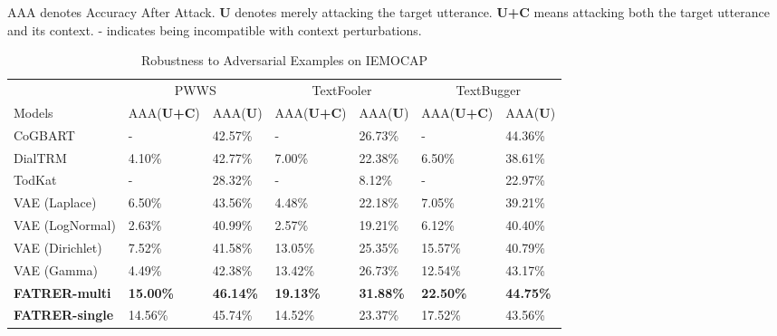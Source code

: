 \documentclass{ecai}
\begin{document}
\begin{table*}[t]
    {\scriptsize AAA denotes Accuracy After Attack. \textbf{U} denotes merely attacking the target utterance. \textbf{U+C} means attacking both the target utterance and its context. - indicates being incompatible with context perturbations.}
    \begin{center}
    \begin{tabular}{p{3cm}|p{1.8cm}p{1.8cm}|p{1.8cm}p{1.8cm}|p{1.8cm}p{1.8cm}}
    \toprule
         & \multicolumn{2}{c|}{PWWS} & \multicolumn{2}{c|}{TextFooler} & \multicolumn{2}{c}{TextBugger} \\
        Models & {\footnotesize AAA(\textbf{U+C}) } & {\footnotesize AAA(\textbf{U}) } 
               & {\footnotesize AAA(\textbf{U+C}) } & {\footnotesize AAA(\textbf{U}) }
               & {\footnotesize AAA(\textbf{U+C}) } & {\footnotesize AAA(\textbf{U}) }\\ 
        \hline\hline
        CoGBART         & -      & 42.57\% &  -      & 26.73\% &       - & 44.36\%\\
        DialTRM         & 4.10\% & 42.77\% &  7.00\% & 22.38\% &  6.50\% & 38.61\%\\
        TodKat          & -      & 28.32\% &  -      &  8.12\% &       - & 22.97\%\\
        VAE (Laplace)   & 6.50\% & 43.56\% &  4.48\% & 22.18\% &  7.05\% & 39.21\%\\ 
        VAE (LogNormal) & 2.63\% & 40.99\% &  2.57\% & 19.21\% &  6.12\% & 40.40\%\\
        VAE (Dirichlet) & 7.52\% & 41.58\% & 13.05\% & 25.35\% & 15.57\% & 40.79\%\\
        VAE (Gamma)     & 4.49\% & 42.38\% & 13.42\% & 26.73\% & 12.54\% & 43.17\%\\
        \hline\hline
        \textbf{FATRER-multi} & \textbf{15.00\%} & \textbf{46.14\%} & \textbf{19.13\%} & \textbf{31.88\%} & \textbf{22.50\%} & \textbf{44.75\%} \\
        \textbf{FATRER-single} & 14.56\% & 45.74\% & 14.52\% & 23.37\% & 17.52\% & 43.56\% \\
    \bottomrule
    \end{tabular}
    \end{center}
    \caption{Robustness to Adversarial Examples on IEMOCAP}
    \label{tab:robustness_iemocap}
\end{table*}
\end{document}
